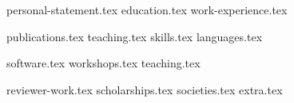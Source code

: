 \documentclass[letterpaper,11pt]{article}
\begin{document}


{personal-statement.tex}
{education.tex}
{work-experience.tex}

\pagebreak

{publications.tex}
{teaching.tex}
\sidebyside
    {{skills.tex}}
    {{languages.tex}}

\pagebreak

{software.tex}
{workshops.tex}
{teaching.tex}

\pagebreak

{reviewer-work.tex}
{scholarships.tex}
{societies.tex}
{extra.tex}
\end{document}
